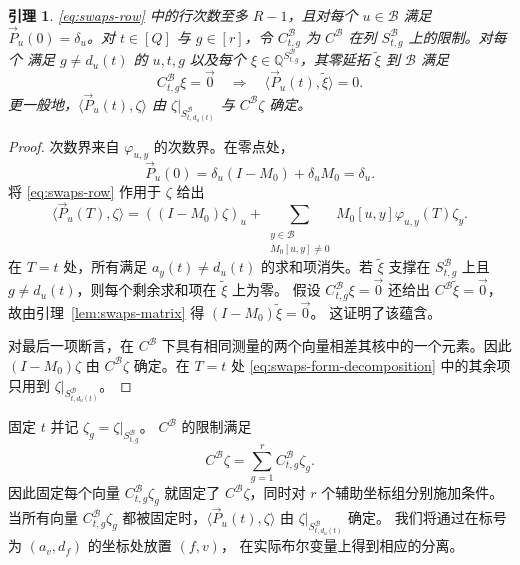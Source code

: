 \documentclass[11pt,reqno]{amsart}
\numberwithin{equation}{section}
\newtheorem{lemma}[theorem]{引理}
\theoremstyle{definition}\newtheorem{definition}[theorem]{定义}
\theoremstyle{remark}\newtheorem{remark}[theorem]{注}
\begin{document}
\begin{lemma}\label{lem:swaps-forms}
\eqref{eq:swaps-row} 中的行次数至多 $R-1$，且对每个 $u\in\mathcal B$
满足 $\vec{P}_u(0)=\delta_u$。对 $t\in[Q]$ 与
$g\in[r]$，令 $C^{\mathcal B}_{t,g}$ 为
$C^{\mathcal B}$ 在列 $S^{\mathcal B}_{t,g}$ 上的限制。对每个
满足 $g\ne d_u(t)$ 的 $u,t,g$ 以及每个
$\xi\in\mathbb Q^{S^{\mathcal B}_{t,g}}$，其零延拓
$\widetilde\xi$ 到 $\mathcal B$ 满足
\[
 C^{\mathcal B}_{t,g}\xi=\vec{0}
 \quad\Longrightarrow\quad \langle \vec{P}_u(t), \widetilde\xi\rangle=0.
\]
更一般地，$\langle \vec{P}_u(t), \zeta\rangle$ 由
$\zeta|_{S^{\mathcal B}_{t,d_u(t)}}$ 与 $C^{\mathcal B}\zeta$ 确定。
\end{lemma}
\begin{proof}
次数界来自 $\varphi_{u,y}$ 的次数界。在零点处，
\[
 \vec{P}_u(0)=\delta_u(I-M_0)+\delta_uM_0=\delta_u.
\]
将 \eqref{eq:swaps-row} 作用于 $\zeta$ 给出
\begin{equation}\label{eq:swaps-form-decomposition}
 \langle \vec{P}_u(T), \zeta\rangle=((I-M_0)\zeta)_u+
 \sum_{\substack{y\in\mathcal B\\M_0[u,y]\ne0}}
 M_0[u,y]\varphi_{u,y}(T)\zeta_y.
\end{equation}
在 $T=t$ 处，所有满足 $a_y(t)\ne d_u(t)$ 的求和项消失。若
$\widetilde\xi$ 支撑在 $S^{\mathcal B}_{t,g}$ 上且
$g\ne d_u(t)$，则每个剩余求和项在 $\widetilde\xi$ 上为零。
假设 $C^{\mathcal B}_{t,g}\xi=\vec{0}$ 还给出
$C^{\mathcal B}\widetilde\xi=\vec{0}$，故由引理~\ref{lem:swaps-matrix} 得
$(I-M_0)\widetilde\xi=\vec{0}$。
这证明了该蕴含。

对最后一项断言，在
$C^{\mathcal B}$ 下具有相同测量的两个向量相差其核中的一个元素。因此
$(I-M_0)\zeta$ 由 $C^{\mathcal B}\zeta$ 确定。在 $T=t$ 处
\eqref{eq:swaps-form-decomposition} 中的其余项只用到
$\zeta|_{S^{\mathcal B}_{t,d_u(t)}}$。
\end{proof}

固定 $t$ 并记 $\zeta_g=\zeta|_{S^{\mathcal B}_{t,g}}$。
$C^{\mathcal B}$ 的限制满足
\begin{equation}\label{eq:auxiliary-measurements}
 C^{\mathcal B}\zeta=\sum_{g=1}^r C^{\mathcal B}_{t,g}\zeta_g.
\end{equation}
因此固定每个向量 $C^{\mathcal B}_{t,g}\zeta_g$ 就固定了
$C^{\mathcal B}\zeta$，同时对
$r$ 个辅助坐标组分别施加条件。当所有向量
$C^{\mathcal B}_{t,g}\zeta_g$ 都被固定时，$\langle \vec{P}_u(t), \zeta\rangle$ 由
$\zeta|_{S^{\mathcal B}_{t,d_u(t)}}$ 确定。
我们将通过在标号为 $(a_v,d_f)$ 的坐标处放置 $(f,v)$，
在实际布尔变量上得到相应的分离。
\end{document}
